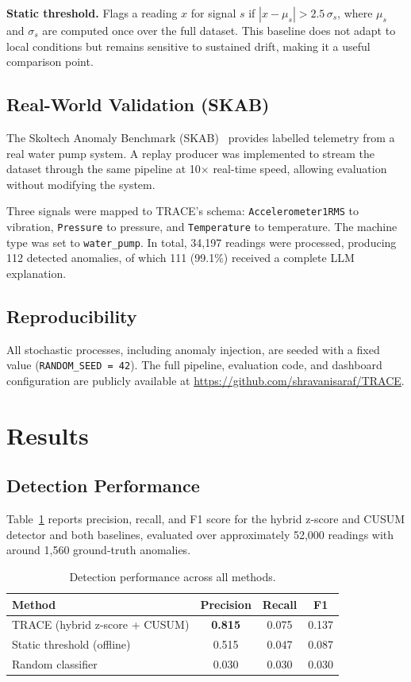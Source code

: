 \documentclass[11pt, a4paper]{article}
\begin{document}
\textbf{Static threshold.} Flags a reading $x$ for signal $s$ if 
$|x - \mu_s| > 2.5\,\sigma_s$, where $\mu_s$ and $\sigma_s$ are computed 
once over the full dataset. This baseline does not adapt to local 
conditions but remains sensitive to sustained drift, making it a useful 
comparison point.

\subsection{Real-World Validation (SKAB)}

The Skoltech Anomaly Benchmark (SKAB)~\cite{katser2020skab} provides 
labelled telemetry from a real water pump system. A replay producer was 
implemented to stream the dataset through the same pipeline at 
10$\times$ real-time speed, allowing evaluation without modifying the 
system.

Three signals were mapped to TRACE's schema: 
\texttt{Accelerometer1RMS} to vibration, \texttt{Pressure} to pressure, 
and \texttt{Temperature} to temperature. The machine type was set to 
\texttt{water\_pump}. In total, 34,197 readings were processed, producing 
112 detected anomalies, of which 111 (99.1\%) received a complete LLM 
explanation.

\subsection{Reproducibility}

All stochastic processes, including anomaly injection, are seeded with a 
fixed value (\texttt{RANDOM\_SEED = 42}). The full pipeline, evaluation 
code, and dashboard configuration are publicly available at 
\url{https://github.com/shravanisaraf/TRACE}.

\section{Results}

\subsection{Detection Performance}

Table~\ref{tab:detection} reports precision, recall, and F1 score for
the hybrid z-score and CUSUM detector and both baselines, evaluated over
approximately 52,000 readings with around 1,560 ground-truth anomalies.

\begin{table}[h]
\centering
\caption{Detection performance across all methods.}
\label{tab:detection}
\begin{tabular}{lccc}
\toprule
\textbf{Method} & \textbf{Precision} & \textbf{Recall} & \textbf{F1} \\
\midrule
TRACE (hybrid z-score + CUSUM) & \textbf{0.815} & 0.075 & 0.137 \\
Static threshold (offline)     & 0.515          & 0.047 & 0.087 \\
Random classifier              & 0.030          & 0.030 & 0.030 \\
\bottomrule
\end{tabular}
\end{table}
\end{document}

